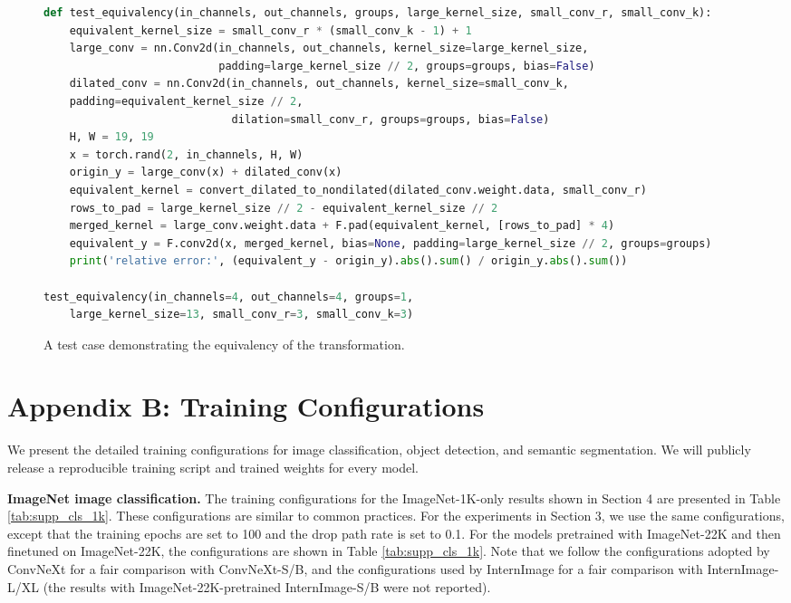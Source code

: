 \documentclass[10pt,twocolumn,letterpaper]{article}
\begin{document}
\begin{figure*}
    \begin{lstlisting}[language=Python]
def test_equivalency(in_channels, out_channels, groups, large_kernel_size, small_conv_r, small_conv_k):
    equivalent_kernel_size = small_conv_r * (small_conv_k - 1) + 1
    large_conv = nn.Conv2d(in_channels, out_channels, kernel_size=large_kernel_size,
                           padding=large_kernel_size // 2, groups=groups, bias=False)
    dilated_conv = nn.Conv2d(in_channels, out_channels, kernel_size=small_conv_k, 
    padding=equivalent_kernel_size // 2,
                             dilation=small_conv_r, groups=groups, bias=False)
    H, W = 19, 19
    x = torch.rand(2, in_channels, H, W)
    origin_y = large_conv(x) + dilated_conv(x)
    equivalent_kernel = convert_dilated_to_nondilated(dilated_conv.weight.data, small_conv_r)
    rows_to_pad = large_kernel_size // 2 - equivalent_kernel_size // 2
    merged_kernel = large_conv.weight.data + F.pad(equivalent_kernel, [rows_to_pad] * 4)
    equivalent_y = F.conv2d(x, merged_kernel, bias=None, padding=large_kernel_size // 2, groups=groups)
    print('relative error:', (equivalent_y - origin_y).abs().sum() / origin_y.abs().sum())

test_equivalency(in_channels=4, out_channels=4, groups=1, 
    large_kernel_size=13, small_conv_r=3, small_conv_k=3)
    \end{lstlisting}
    \caption{A test case demonstrating the equivalency of the transformation.}
    \label{fig:testcase}
\end{figure*}


\section*{Appendix B: Training Configurations}

We present the detailed training configurations for image classification, object detection, and semantic segmentation. We will publicly release a reproducible training script and trained weights for every model.

\noindent\textbf{ImageNet image classification.} The training configurations for the ImageNet-1K-only results shown in Section 4 are presented in Table \ref{tab:supp_cls_1k}. These configurations are similar to common practices. For the experiments in Section 3, we use the same configurations, except that the training epochs are set to 100 and the drop path rate is set to 0.1. For the models pretrained with ImageNet-22K and then finetuned on ImageNet-22K, the configurations are shown in Table \ref{tab:supp_cls_1k}. Note that we follow the configurations adopted by ConvNeXt for a fair comparison with ConvNeXt-S/B, and the configurations used by InternImage for a fair comparison with InternImage-L/XL (the results with ImageNet-22K-pretrained InternImage-S/B were not reported).
\end{document}
